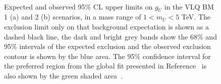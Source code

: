 \begin{figure}[!hbtp]
\centering
     \\
\caption[Plots of the model-dependent limits in the vector leptoquark phase space.]{Expected and observed 95\% CL upper limits on $g_U$ in the VLQ BM 1 (a) and 2 (b) scenarios, in a mass range of $1<m_{U}<5$ TeV.  The exclusion limit only on that background expectation is shown as a dashed black line, the dark and bright grey bands show the 68\% and 95\% intervals of the expected exclusion and the observed exclusion contour is shown by the blue area. The 95\% confidence interval for the preferred region from the global fit presented in Reference~\cite{Cornella:2021sby} is also shown by the green shaded area~\cite{CMS:2022rbd}.}
\label{fig:vlq_limits}
\end{figure}

